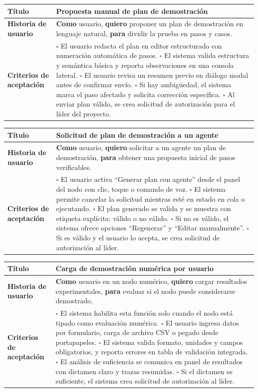 \documentclass{article}
\newcommand{\story}[3]{
\begin{table}[H]
    \centering
    \begin{tabularx}{\textwidth}{| >{\raggedright\arraybackslash\bfseries\columncolor{leftheaderbg}}p{2.5cm} | >{\raggedright\arraybackslash\columncolor{contentbg}}X |}
        \hline
        Título & #1 \\
        \hline
        Historia de usuario & #2 \\
        \hline
        Criterios de aceptación & #3 \\
        \hline
    \end{tabularx}
\end{table}
}
\begin{document}
\story
{Propuesta manual de plan de demostración}
{\textbf{Como} usuario, \textbf{quiero} proponer un plan de demostración en lenguaje natural, \textbf{para} dividir la prueba en pasos y casos.}
{$\square$ El usuario redacta el plan en editor estructurado con numeración automática de pasos. \newline
$\square$ El sistema valida estructura y semántica básica y reporta observaciones en una consola lateral. \newline
$\square$ El usuario revisa un resumen previo en diálogo modal antes de confirmar envío. \newline
$\square$ Si hay ambigüedad, el sistema marca el paso afectado y solicita corrección específica. \newline
$\square$ Al enviar plan válido, se crea solicitud de autorización para el líder del proyecto.}

\story
{Solicitud de plan de demostración a un agente}
{\textbf{Como} usuario, \textbf{quiero} solicitar a un agente un plan de demostración, \textbf{para} obtener una propuesta inicial de pasos verificables.}
{$\square$ El usuario activa ``Generar plan con agente'' desde el panel del nodo con clic, toque o comando de voz. \newline
$\square$ El sistema permite cancelar la solicitud mientras esté en estado en cola o ejecutando. \newline
$\square$ El plan generado se valida y se muestra con etiqueta explícita: válido o no válido. \newline
$\square$ Si no es válido, el sistema ofrece opciones ``Regenerar'' y ``Editar manualmente''. \newline
$\square$ Si es válido y el usuario lo acepta, se crea solicitud de autorización al líder.}

\story
{Carga de demostración numérica por usuario}
{\textbf{Como} usuario en un nodo numérico, \textbf{quiero} cargar resultados experimentales, \textbf{para} evaluar si el nodo puede considerarse demostrado.}
{$\square$ El sistema habilita esta función solo cuando el nodo está tipado como evaluación numérica. \newline
$\square$ El usuario ingresa datos por formulario, carga de archivo CSV o pegado desde portapapeles. \newline
$\square$ El sistema valida formato, unidades y campos obligatorios, y reporta errores en tabla de validación integrada. \newline
$\square$ El análisis de suficiencia se comunica en panel de resultados con dictamen claro y trazas resumidas. \newline
$\square$ Si el dictamen es suficiente, el sistema crea solicitud de autorización al líder.}
\end{document}
